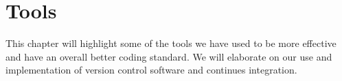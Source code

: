 \chapter{Tools}\label{cha:tools}
This chapter will highlight some of the tools we have used to be more effective and have an overall better coding standard.
We will elaborate on our use and implementation of version control software and continues integration.


